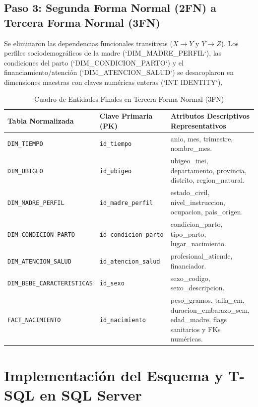 \documentclass[12pt,a4paper]{article}
\begin{document}
\subsection{Paso 3: Segunda Forma Normal (2FN) a Tercera Forma Normal (3FN)}
Se eliminaron las dependencias funcionales transitivas ($X \rightarrow Y$ y $Y \rightarrow Z$). Los perfiles sociodemográficos de la madre (`DIM_MADRE_PERFIL`), las condiciones del parto (`DIM_CONDICION_PARTO`) y el financiamiento/atención (`DIM_ATENCION_SALUD`) se desacoplaron en dimensiones maestras con claves numéricas enteras (`INT IDENTITY`).

\begin{table}[H]
\centering
\footnotesize
\caption{Cuadro de Entidades Finales en Tercera Forma Normal (3FN)}
\begin{tabular}{llp{7.5cm}}
\toprule
\textbf{Tabla Normalizada} & \textbf{Clave Primaria (PK)} & \textbf{Atributos Descriptivos Representativos} \\
\midrule
\texttt{DIM\_TIEMPO} & \texttt{id\_tiempo} & anio, mes, trimestre, nombre\_mes. \\
\texttt{DIM\_UBIGEO} & \texttt{id\_ubigeo} & ubigeo\_inei, departamento, provincia, distrito, region\_natural. \\
\texttt{DIM\_MADRE\_PERFIL} & \texttt{id\_madre\_perfil} & estado\_civil, nivel\_instruccion, ocupacion, pais\_origen. \\
\texttt{DIM\_CONDICION\_PARTO} & \texttt{id\_condicion\_parto} & condicion\_parto, tipo\_parto, lugar\_nacimiento. \\
\texttt{DIM\_ATENCION\_SALUD} & \texttt{id\_atencion\_salud} & profesional\_atiende, financiador. \\
\texttt{DIM\_BEBE\_CARACTERISTICAS} & \texttt{id\_sexo} & sexo\_codigo, sexo\_descripcion. \\
\texttt{FACT\_NACIMIENTO} & \texttt{id\_nacimiento} & peso\_gramos, talla\_cm, duracion\_embarazo\_sem, edad\_madre, flags sanitarios y FKs numéricas. \\
\bottomrule
\end{tabular}
\end{table}

\newpage

\section{Implementación del Esquema y T-SQL en SQL Server}
\end{document}
